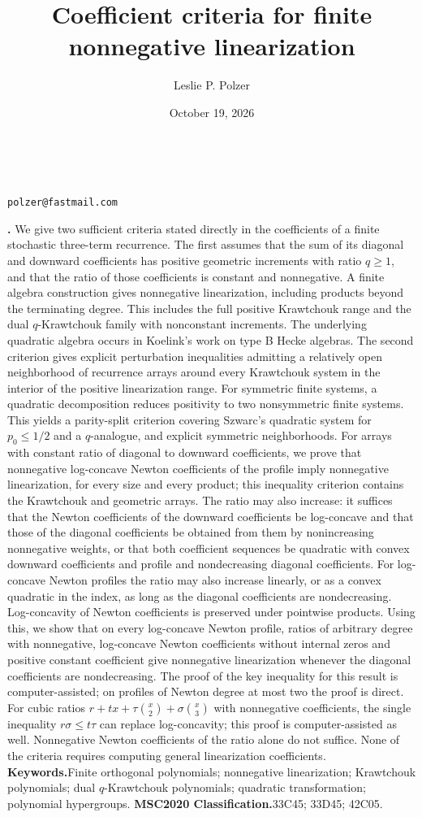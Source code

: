 \documentclass[twoside,10pt]{article}
\title{Coefficient criteria for finite nonnegative linearization}
\author{Leslie P. Polzer}
\date{October 19, 2026}
\makeatletter
\numberwithin{equation}{section}
\theoremstyle{slbody}
\theoremstyle{definition}
\theoremstyle{remark}
\newcommand{\authoraffiliation}{Independent Researcher}
\newcommand{\authoremail}{polzer@fastmail.com}
\renewcommand{\maketitle}{\begin{center}{\large\bfseries\@title}\\\vskip36pt
{\scshape\@author}\par\medskip{\small\authoraffiliation}\par\smallskip
{\small\texttt{\authoremail}}\par\smallskip{\small\@date}\par\vskip36pt\end{center}}
\renewenvironment{abstract}{\quotation\noindent\small{\bfseries\abstractname.\enspace}}{\endquotation}
\makeatother
\begin{document}
\maketitle

\begin{abstract}
We give two sufficient criteria stated directly in the coefficients of a finite stochastic three-term recurrence. The first assumes that the sum of its diagonal and downward coefficients has positive geometric increments with ratio $q\geq1$, and that the ratio of those coefficients is constant and nonnegative. A finite algebra construction gives nonnegative linearization, including products beyond the terminating degree. This includes the full positive Krawtchouk range and the dual $q$-Krawtchouk family with nonconstant increments. The underlying quadratic algebra occurs in Koelink's work on type B Hecke algebras. The second criterion gives explicit perturbation inequalities admitting a relatively open neighborhood of recurrence arrays around every Krawtchouk system in the interior of the positive linearization range. For symmetric finite systems, a quadratic decomposition reduces positivity to two nonsymmetric finite systems. This yields a parity-split criterion covering Szwarc's quadratic system for $p_0\leq1/2$ and a $q$-analogue, and explicit symmetric neighborhoods. For arrays with constant ratio of diagonal to downward coefficients, we prove that nonnegative log-concave Newton coefficients of the profile imply nonnegative linearization, for every size and every product; this inequality criterion contains the Krawtchouk and geometric arrays. The ratio may also increase: it suffices that the Newton coefficients of the downward coefficients be log-concave and that those of the diagonal coefficients be obtained from them by nonincreasing nonnegative weights, or that both coefficient sequences be quadratic with convex downward coefficients and profile and nondecreasing diagonal coefficients. For log-concave Newton profiles the ratio may also increase linearly, or as a convex quadratic in the index, as long as the diagonal coefficients are nondecreasing. Log-concavity of Newton coefficients is preserved under pointwise products. Using this, we show that on every log-concave Newton profile, ratios of arbitrary degree with nonnegative, log-concave Newton coefficients without internal zeros and positive constant coefficient give nonnegative linearization whenever the diagonal coefficients are nondecreasing. The proof of the key inequality for this result is computer-assisted; on profiles of Newton degree at most two the proof is direct. For cubic ratios $r+tx+\tau\binom x2+\sigma\binom x3$ with nonnegative coefficients, the single inequality $r\sigma\leq t\tau$ can replace log-concavity; this proof is computer-assisted as well. Nonnegative Newton coefficients of the ratio alone do not suffice. None of the criteria requires computing general linearization coefficients.
\vskip5pt
\noindent\textbf{Keywords.}\enspace Finite orthogonal polynomials; nonnegative linearization; Krawtchouk polynomials; dual $q$-Krawtchouk polynomials; quadratic transformation; polynomial hypergroups.
\vskip5pt
\noindent\textbf{MSC2020 Classification.}\enspace 33C45; 33D45; 42C05.
\end{abstract}
\end{document}
